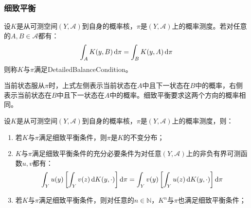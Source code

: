 \subsubsection{细致平衡}
\begin{definition}
	设$K$是从可测空间$(Y,\mathscr{A})$到自身的概率核，$\pi$是$(Y,\mathscr{A})$上的概率测度。若对任意的$A,B\in\mathscr{A}$都有：
	\begin{equation*}
		\int_{A}K(y,B)\mathop{}\!\mathrm{d}\pi=\int_{B}K(y,A)\mathop{}\!\mathrm{d}\pi
	\end{equation*}
	则称$K$与$\pi$满足\gls{DetailedBalanceCondition}。
\end{definition}
\begin{note}
	当前状态服从$\pi$时，上式左侧表示当前状态在$A$中且下一状态在$B$中的概率，右侧表示当前状态在$B$中且下一状态在$A$中的概率。细致平衡要求这两个方向的概率相同。
\end{note}
\begin{property}\label{prop:DetailedBalance}
	设$K$是从可测空间$(Y,\mathscr{A})$到自身的概率核，$\pi$是$(Y,\mathscr{A})$上的概率测度，则：
	\begin{enumerate}
		\item 若$K$与$\pi$满足细致平衡条件，则$\pi$是$K$的不变分布；
		\item $K$与$\pi$满足细致平衡条件的充分必要条件为对任意$(Y,\mathscr{A})$上的非负有界可测函数$u,v$都有：
		\begin{equation*}
			\int_{Y}u(y)\left[\int_{Y}v(z)\mathop{}\!\mathrm{d} K(y,\cdot)\right]\mathop{}\!\mathrm{d}\pi
			=\int_{Y}v(y)\left[\int_{Y}u(z)\mathop{}\!\mathrm{d} K(y,\cdot)\right]\mathop{}\!\mathrm{d}\pi
		\end{equation*}
		\item 若$K$与$\pi$满足细致平衡条件，则对任意的$n\in\mathbb{N}$，$K^n$与$\pi$也满足细致平衡条件；
	\end{enumerate}
\end{property}
